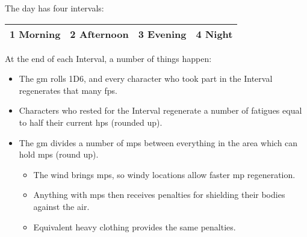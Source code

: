 The day has four intervals:

\noindent
\begin{tabularx}{\linewidth}{c|c|c|c}

  \hline
  1 \textbf{Morning} & 2 \textbf{Afternoon} & 3 \textbf{Evening} & 4 \textbf{Night} \\
  \hline
\end{tabularx}

At the end of each Interval, a number of things happen:

\begin{itemize}
  \item
  The \gls{gm} rolls 1D6, and every character who took part in the Interval regenerates that many \glspl{fp}.
  \item
  Characters who rested for the Interval regenerate a number of \glspl{fatigue} equal to half their current \glspl{hp} (rounded up).
  \item
  The \gls{gm} divides a number of \glspl{mp} between everything in the area which can hold \glspl{mp} (round up).
  \begin{itemize}
    \item
      The wind brings \glspl{mp}, so windy locations allow faster \gls{mp} regeneration.

    \manaRegenChart
    \item
    Anything with \glspl{mp} then receives penalties for shielding their bodies against the air.

    \manaCoveringChart
    \item
    Equivalent heavy clothing provides the same penalties.
  \end{itemize}
\end{itemize}
